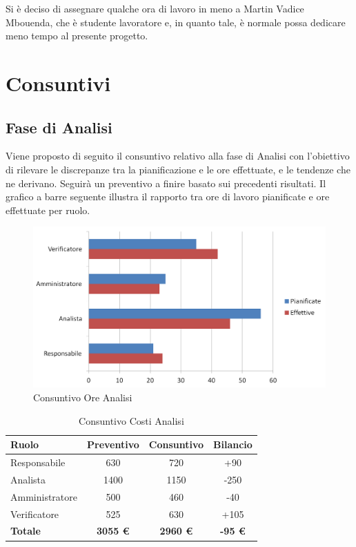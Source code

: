\documentclass[a4paper,11pt]{article}
\begin{document}
	Si è deciso di assegnare qualche ora di lavoro in meno a Martin Vadice Mbouenda, che è studente lavoratore e, in quanto tale, è normale possa dedicare meno tempo al presente progetto.
	\newpage
		
	\section{Consuntivi} \label{conto:consuntivo}
	\subsection{Fase di Analisi}
	Viene proposto di seguito il consuntivo relativo alla fase di Analisi con l'obiettivo di rilevare le discrepanze tra la pianificazione e le ore effettuate, e le tendenze che ne derivano. Seguirà un preventivo a finire basato sui precedenti risultati.
	\newline
	Il grafico a barre seguente illustra il rapporto tra ore di lavoro pianificate e ore effettuate per ruolo.
	\begin{figure}[h!]
		\centering
		\includegraphics[scale=0.7]{../Images/chart-Consuntivo_Ore_Analisi}
	\caption{Consuntivo Ore Analisi}
	\end{figure}
	
	\begin{table}[h!]
	\begin{center}
		\begin{tabular}{l c c c}
			\textbf{Ruolo} & \textbf{Preventivo} & \textbf{Consuntivo} &\textbf{Bilancio}\\
			\midrule
			Responsabile 	& 630 	& 720	& +90	\\
			Analista 		& 1400 	& 1150	& -250	\\
			Amministratore 	& 500 	& 460	& -40	\\
			Verificatore 	& 525 	& 630	& +105	\\
			\midrule
			\textbf{Totale} & \textbf{3055 \euro} & \textbf{2960 \euro}	& \textbf{-95 \euro}
		\end{tabular}
		\end{center}
	\caption{Consuntivo Costi Analisi}
	\end{table}
\end{document}
